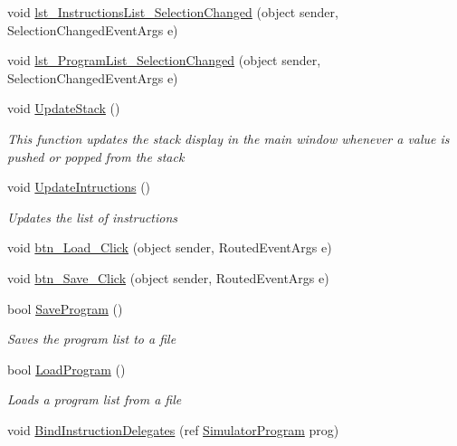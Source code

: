 \begin{DoxyCompactItemize}
void \hyperlink{class_c_p_u___o_s___simulator_1_1_main_window_a5013d1984fc170246a5dc0d26c6fc493}{lst\+\_\+\+Instructions\+List\+\_\+\+Selection\+Changed} (object sender, Selection\+Changed\+Event\+Args e)
\item 
void \hyperlink{class_c_p_u___o_s___simulator_1_1_main_window_ab563b461cf3d62bd3c88eeb7921bfa75}{lst\+\_\+\+Program\+List\+\_\+\+Selection\+Changed} (object sender, Selection\+Changed\+Event\+Args e)
\item 
void \hyperlink{class_c_p_u___o_s___simulator_1_1_main_window_abd01bb7788b0c104045bcc93cf03c9d6}{Update\+Stack} ()
\begin{DoxyCompactList}\small\item\em This function updates the stack display in the main window whenever a value is pushed or popped from the stack \end{DoxyCompactList}\item 
void \hyperlink{class_c_p_u___o_s___simulator_1_1_main_window_a677bf9ebdb9fe30caa0f52f93e5390c9}{Update\+Intructions} ()
\begin{DoxyCompactList}\small\item\em Updates the list of instructions \end{DoxyCompactList}\item 
void \hyperlink{class_c_p_u___o_s___simulator_1_1_main_window_a13c54c19f906fc84076fe654f82f5398}{btn\+\_\+\+Load\+\_\+\+Click} (object sender, Routed\+Event\+Args e)
\item 
void \hyperlink{class_c_p_u___o_s___simulator_1_1_main_window_a3bbf0774868d6b5da4ff08d70e236fa6}{btn\+\_\+\+Save\+\_\+\+Click} (object sender, Routed\+Event\+Args e)
\item 
bool \hyperlink{class_c_p_u___o_s___simulator_1_1_main_window_a843bbe93c5c2225820d216cc1cb7d4e9}{Save\+Program} ()
\begin{DoxyCompactList}\small\item\em Saves the program list to a file \end{DoxyCompactList}\item 
bool \hyperlink{class_c_p_u___o_s___simulator_1_1_main_window_ad788d74c9d6582f3302912cbbba410b0}{Load\+Program} ()
\begin{DoxyCompactList}\small\item\em Loads a program list from a file \end{DoxyCompactList}\item 
void \hyperlink{class_c_p_u___o_s___simulator_1_1_main_window_afe4c815db0eb51ebc480374f5af09d0c}{Bind\+Instruction\+Delegates} (ref \hyperlink{class_c_p_u___o_s___simulator_1_1_c_p_u_1_1_simulator_program}{Simulator\+Program} prog)

\end{DoxyCompactItemize}

